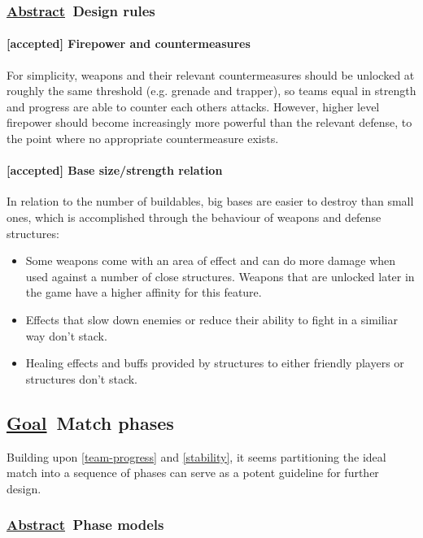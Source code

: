 \documentclass{scrartcl}
\newcommand{\goal}     [0]{\textbf{\underline{Goal}\ }}
\newcommand{\abstrac}  [0]{\textbf{\underline{Abstract}\ }}
\newcommand{\accepted} [0]{\textcolor{completed}{\textbf{[accepted] }}}
\begin{document}
\subsubsection{\abstrac Design rules}

\paragraph{\accepted Firepower and countermeasures}

For simplicity, weapons and their relevant countermeasures should be unlocked at roughly the same threshold (e.g. grenade and trapper), so teams equal in strength and progress are able to counter each others attacks. However, higher level firepower should become increasingly more powerful than the relevant defense, to the point where no appropriate countermeasure exists.

\paragraph{\accepted Base size/strength relation}

In relation to the number of buildables, big bases are easier to destroy than small ones, which is accomplished through the behaviour of weapons and defense structures:

\begin{itemize}
\item Some weapons come with an area of effect and can do more damage when used against a number of close structures. Weapons that are unlocked later in the game have a higher affinity for this feature.
\item Effects that slow down enemies or reduce their ability to fight in a similiar way don't stack.
\item Healing effects and buffs provided by structures to either friendly players or structures don't stack.
\end{itemize}

\subsection{\goal Match phases}

Building upon \ref{team-progress} and \ref{stability}, it seems partitioning the ideal match into a sequence of phases can serve as a potent guideline for further design.

\subsubsection{\abstrac Phase models}
\end{document}
